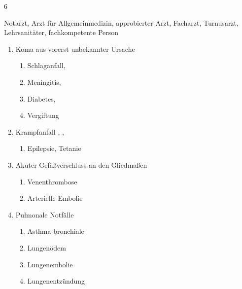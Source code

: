   \begin{inparadesc}
    \item[Stundenanzahl:]  6
    \item[Lehrkraft:]  Notarzt, Arzt für Allgemeinmedizin, approbierter Arzt,
    Facharzt, Turnusarzt, Lehrsanitäter, fachkompetente Person
  \end{inparadesc}
  \begin{enumerate}\item
    Koma aus vorerst unbekannter Ursache
    \begin{enumerate}
      \item      Schlaganfall, \dotfill {}
      \item      Meningitis, \dotfill  {}
      \item      Diabetes, \dotfill  {}
      \item      Vergiftung \dotfill  {}
    \end{enumerate}
    \item
    Krampfanfall  \dotfill {},
    ,
     \\
    \begin{enumerate}
      \item     Epilepsie, Tetanie \dotfill {}
    \end{enumerate}
    \item Akuter Gefäßverschluss an den Gliedmaßen
    \begin{enumerate}
      \item      Venenthrombose \dotfill {}
      \item      Arterielle Embolie \dotfill  {}
    \end{enumerate}
    \item Pulmonale Notfälle
    \begin{enumerate}
      \item      Asthma bronchiale \dotfill {}
      \item      Lungenödem \dotfill {}
      \item      Lungenembolie \dotfill {}
      \item      Lungenentzündung \dotfill {}
    \end{enumerate}

\end{enumerate}

